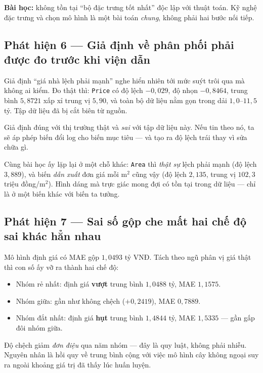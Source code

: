 \textbf{Bài học:} không tồn tại ``bộ đặc trưng tốt nhất'' độc lập với thuật
toán. Kỹ nghệ đặc trưng và chọn mô hình là một bài toán \emph{chung}, không phải
hai bước nối tiếp.

\subsection{Phát hiện 6 --- Giả định về phân phối phải được đo trước khi viện dẫn}

Giả định ``giá nhà lệch phải mạnh'' nghe hiển nhiên tới mức suýt trôi qua mà
không ai kiểm. Đo thật thì: \texttt{Price} có độ lệch $-0{,}029$, độ nhọn
$-0{,}8464$, trung bình $5{,}8721$ xấp xỉ trung vị $5{,}90$, và toàn bộ dữ liệu
nằm gọn trong dải $1{,}0$--$11{,}5$ tỷ. Tập dữ liệu đã bị cắt biên từ nguồn.

Giả định đúng với thị trường thật và \emph{sai} với tập dữ liệu này. Nếu tin
theo nó, ta sẽ áp phép biến đổi log cho biến mục tiêu --- và tạo ra độ lệch trái
thay vì sửa chữa gì.

Cùng bài học ấy lặp lại ở một chỗ khác: \texttt{Area} thì \emph{thật sự} lệch
phải mạnh (độ lệch $3{,}889$), và biến \emph{dẫn xuất} đơn giá mỗi m$^2$ cũng
vậy (độ lệch $2{,}135$, trung vị $102{,}3$ triệu đồng/m$^2$). Hình dáng mà trực
giác mong đợi có tồn tại trong dữ liệu --- chỉ là ở một biến khác với biến ta
tưởng.

\subsection{Phát hiện 7 --- Sai số gộp che mất hai chế độ sai khác hẳn nhau}

Mô hình định giá có MAE gộp $1{,}0493$ tỷ VNĐ. Tách theo ngũ phân vị giá thật
thì con số ấy vỡ ra thành hai chế độ:

\begin{itemize}
  \item Nhóm rẻ nhất: định giá \textbf{vượt} trung bình $1{,}0488$ tỷ, MAE
        $1{,}1575$.
  \item Nhóm giữa: gần như không chệch ($+0{,}2419$), MAE $0{,}7889$.
  \item Nhóm đắt nhất: định giá \textbf{hụt} trung bình $1{,}4844$ tỷ, MAE
        $1{,}5335$ --- gần gấp đôi nhóm giữa.
\end{itemize}

Độ chệch giảm \emph{đơn điệu} qua năm nhóm --- đây là quy luật, không phải nhiễu.
Nguyên nhân là hồi quy về trung bình cộng với việc mô hình cây không ngoại suy
ra ngoài khoảng giá trị đã thấy lúc huấn luyện.


